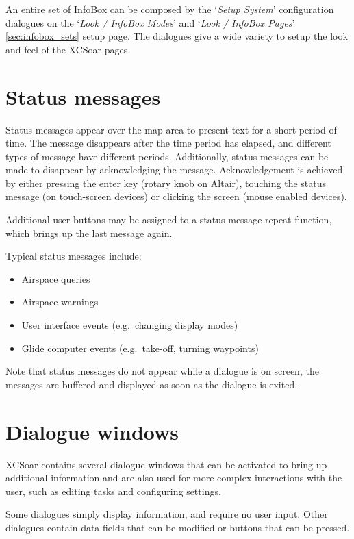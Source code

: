 An entire set of InfoBox can be composed by the `{\it Setup System}' configuration
dialogues on the `{\it Look / InfoBox Modes}' and `{\it Look / InfoBox Pages}'
\ref{sec:infobox_sets} setup page.
The dialogues give a wide variety to setup the look and feel of the XCSoar pages.


\section{Status messages}

Status messages appear over the map area to present text for a short period of
time.  The message disappears after the time period has elapsed, and different
types of message have different periods. Additionally, status messages can be
made to disappear by acknowledging the message.  Acknowledgement is achieved by
either pressing the enter key (rotary knob on Altair), touching the status
message (on touch-screen devices) or clicking the screen (mouse enabled devices).

Additional user buttons may be assigned to a status message repeat function,
which brings up the last message again.

Typical status messages include:
\begin{itemize}
\item Airspace queries
\item Airspace warnings
\item User interface events (e.g.\ changing display modes)
\item Glide computer events (e.g.\ take-off, turning waypoints)
\end{itemize}

Note that status messages do not appear while a dialogue is on screen, the
messages are buffered and displayed as soon as the dialogue is exited.


\section{Dialogue windows}\label{sec:dialog-windows}

XCSoar contains several dialogue windows that can be activated to bring up
additional information and are also used for more complex interactions with the
user, such as editing tasks and configuring settings.

Some dialogues simply display information, and require no user input. Other
dialogues contain data fields that can be modified or buttons that can be pressed.

